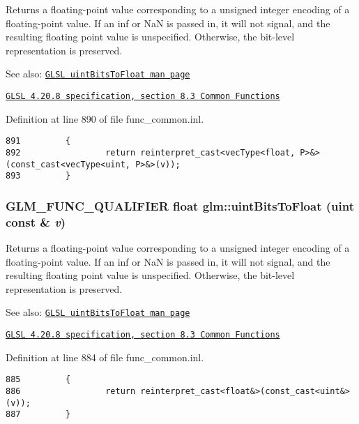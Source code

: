 Returns a floating-point value corresponding to a unsigned integer encoding of a floating-point value. If an inf or NaN is passed in, it will not signal, and the resulting floating point value is unspecified. Otherwise, the bit-level representation is preserved.

\begin{Desc}
\item[See also:]\href{http://www.opengl.org/sdk/docs/manglsl/xhtml/uintBitsToFloat.xml}{\tt GLSL uintBitsToFloat man page} 

\href{http://www.opengl.org/registry/doc/GLSLangSpec.4.20.8.pdf}{\tt GLSL 4.20.8 specification, section 8.3 Common Functions} \end{Desc}


Definition at line 890 of file func\_\-common.inl.

\begin{Code}\begin{verbatim}891         {
892                 return reinterpret_cast<vecType<float, P>&>(const_cast<vecType<uint, P>&>(v));
893         }
\end{verbatim}
\end{Code}


\hypertarget{group__core__func__common_g97464ca9ff4267de30ea408f700d4ca8}{
\subsubsection[uintBitsToFloat]{\setlength{\rightskip}{0pt plus 5cm}GLM\_\-FUNC\_\-QUALIFIER float glm::uintBitsToFloat (uint const \& {\em v})}}
\label{group__core__func__common_g97464ca9ff4267de30ea408f700d4ca8}


Returns a floating-point value corresponding to a unsigned integer encoding of a floating-point value. If an inf or NaN is passed in, it will not signal, and the resulting floating point value is unspecified. Otherwise, the bit-level representation is preserved.

\begin{Desc}
\item[See also:]\href{http://www.opengl.org/sdk/docs/manglsl/xhtml/uintBitsToFloat.xml}{\tt GLSL uintBitsToFloat man page} 

\href{http://www.opengl.org/registry/doc/GLSLangSpec.4.20.8.pdf}{\tt GLSL 4.20.8 specification, section 8.3 Common Functions} \end{Desc}


Definition at line 884 of file func\_\-common.inl.

\begin{Code}\begin{verbatim}885         {
886                 return reinterpret_cast<float&>(const_cast<uint&>(v));
887         }
\end{verbatim}
\end{Code}


